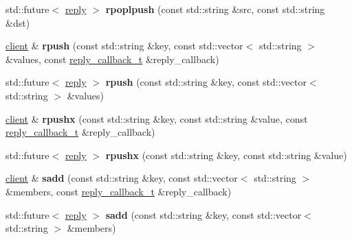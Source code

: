 \begin{DoxyCompactItemize}
\mbox{\label{classcpp__redis_1_1client_a4c4fd3342f665a4d902b42b051797e51}} 
std\+::future$<$ \hyperlink{classcpp__redis_1_1reply}{reply} $>$ {\bfseries rpoplpush} (const std\+::string \&src, const std\+::string \&dst)
\item 
\mbox{\label{classcpp__redis_1_1client_a925a0b8ae7864783d9e164776ca07075}} 
\hyperlink{classcpp__redis_1_1client}{client} \& {\bfseries rpush} (const std\+::string \&key, const std\+::vector$<$ std\+::string $>$ \&values, const \hyperlink{classcpp__redis_1_1client_a061a1140d36d2eaeda82b09a0bb3f9f2}{reply\+\_\+callback\+\_\+t} \&reply\+\_\+callback)
\item 
\mbox{\label{classcpp__redis_1_1client_a1e135e9e69a92a0b54059d5f81f9ff25}} 
std\+::future$<$ \hyperlink{classcpp__redis_1_1reply}{reply} $>$ {\bfseries rpush} (const std\+::string \&key, const std\+::vector$<$ std\+::string $>$ \&values)
\item 
\mbox{\label{classcpp__redis_1_1client_a051fdb76cf3d40bd7c0ea0dcb0eed36e}} 
\hyperlink{classcpp__redis_1_1client}{client} \& {\bfseries rpushx} (const std\+::string \&key, const std\+::string \&value, const \hyperlink{classcpp__redis_1_1client_a061a1140d36d2eaeda82b09a0bb3f9f2}{reply\+\_\+callback\+\_\+t} \&reply\+\_\+callback)
\item 
\mbox{\label{classcpp__redis_1_1client_a83d512f8f44f896383d050920634489f}} 
std\+::future$<$ \hyperlink{classcpp__redis_1_1reply}{reply} $>$ {\bfseries rpushx} (const std\+::string \&key, const std\+::string \&value)
\item 
\mbox{\label{classcpp__redis_1_1client_acf725ad7bc758599617ff166280f9622}} 
\hyperlink{classcpp__redis_1_1client}{client} \& {\bfseries sadd} (const std\+::string \&key, const std\+::vector$<$ std\+::string $>$ \&members, const \hyperlink{classcpp__redis_1_1client_a061a1140d36d2eaeda82b09a0bb3f9f2}{reply\+\_\+callback\+\_\+t} \&reply\+\_\+callback)
\item 
\mbox{\label{classcpp__redis_1_1client_a1a611fd2c5847d37973fed5d24f25fa1}} 
std\+::future$<$ \hyperlink{classcpp__redis_1_1reply}{reply} $>$ {\bfseries sadd} (const std\+::string \&key, const std\+::vector$<$ std\+::string $>$ \&members)

\end{DoxyCompactItemize}
